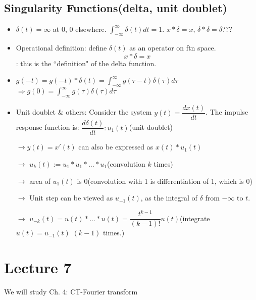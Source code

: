 \documentclass{article}
\begin{document}
\subsection{Singularity Functions(delta, unit doublet)}
\begin{itemize}
\item $\delta(t) = \infty$ at 0, 0 elsewhere. $\displaystyle\int_{-\infty}^{\infty}{\delta(t)dt} = 1$.
$x*\delta = x$, $\delta*\delta=\delta$???

\item Operational definition: define $\delta(t)$ as an operator on ftn space.
\[x*\delta = x\]: this is the ``definition" of the delta function.
\item $g(-t) = g(-t)*\delta(t) = \displaystyle\int_{-\infty}^{\infty}{g(\tau-t)\delta(\tau)d\tau}$
 $\Rightarrow g(0) = \displaystyle\int_{-\infty}^{\infty}{g(\tau)\delta(\tau)d\tau}$

\item Unit doublet \& others: Consider the system $y(t) = \dfrac{dx(t)}{dt}$. The impulse response function is: $\dfrac{d\delta(t)}{dt}: u_1(t)$(unit doublet) 

$\rightarrow y(t)=x'(t)$ can also be expressed as $x(t)*u_1(t)$

$\rightarrow$ $u_k(t) := u_1*u_1*...*u_1$(convolution $k$ times)

$\rightarrow$ area of $u_1(t)$ is 0(convolution with 1 is differentiation of 1, which is 0)

$\rightarrow$ Unit step can be viewed as $u_{-1}(t)$, as the integral of $\delta$ from $-\infty$ to $t$.

$\rightarrow$ $u_{-k}(t) = u(t)*...*u(t) = \dfrac{t^{k-1}}{(k-1)!}u(t)$(integrate $u(t)=u_{-1}(t)$ $(k-1)$ times.)
\end{itemize}
\section{Lecture 7}
We will study Ch. 4: CT-Fourier transform
\end{document}

